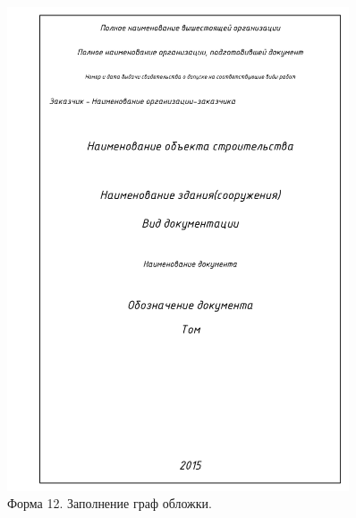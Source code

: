 \documentclass[14pt]{extreport}
\begin{document}
\begin{figure}[h]
	\centering
	\includegraphics[width=0.9\textwidth]{SPDS_OBLOZHKA_without_tagname}
    \caption{Форма 12. Заполнение граф обложки.\label{SPDS_OBLOZHKA_without_tagname}}
\end{figure}
\end{document}
